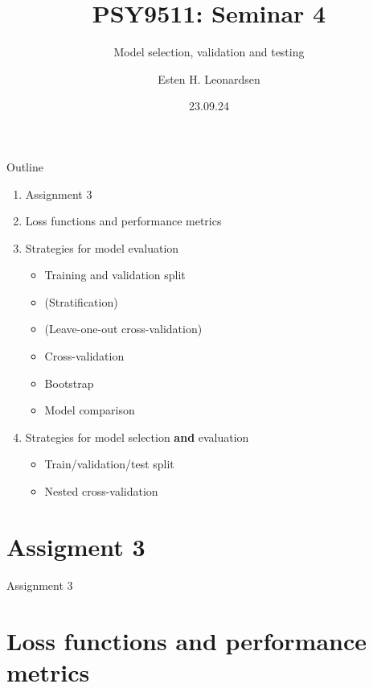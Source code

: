 \documentclass[10pt]{beamer}
\title{PSY9511: Seminar 4}
\subtitle{Model selection, validation and testing}
\author{Esten H. Leonardsen}
\date{23.09.24}
\begin{document}
	\begin{frame}
	 	\titlepage
	\end{frame}

    \begin{frame}{Outline}
        \begin{enumerate}
            \item Assignment 3
            \item Loss functions and performance metrics
            \item Strategies for model evaluation
            \begin{itemize}
                \item Training and validation split
                \item (Stratification)
                \item (Leave-one-out cross-validation)
                \item Cross-validation
                \item Bootstrap
                \item Model comparison
            \end{itemize}
            \item Strategies for model selection \textbf{and} evaluation
            \begin{itemize}
                \item Train/validation/test split
                \item Nested cross-validation
            \end{itemize}
        \end{enumerate}
    \end{frame}

    \section{Assigment 3}

    \begin{frame}{Assignment 3}
    \end{frame}

    \section{Loss functions and performance metrics}
\end{document}
